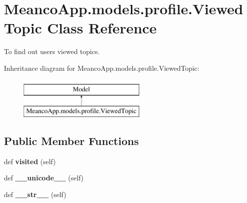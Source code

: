 \hypertarget{class_meanco_app_1_1models_1_1profile_1_1_viewed_topic}{}\section{Meanco\+App.\+models.\+profile.\+Viewed\+Topic Class Reference}
\label{class_meanco_app_1_1models_1_1profile_1_1_viewed_topic}


To find out users viewed topics.  


Inheritance diagram for Meanco\+App.\+models.\+profile.\+Viewed\+Topic\+:\begin{figure}[H]
\begin{center}
\leavevmode
\includegraphics[height=2.000000cm]{class_meanco_app_1_1models_1_1profile_1_1_viewed_topic}
\end{center}
\end{figure}
\subsection*{Public Member Functions}
\begin{DoxyCompactItemize}
\item 
\hypertarget{class_meanco_app_1_1models_1_1profile_1_1_viewed_topic_a1aa94a5df0d638d8eb022a9fc34f1b35}{}\label{class_meanco_app_1_1models_1_1profile_1_1_viewed_topic_a1aa94a5df0d638d8eb022a9fc34f1b35} 
def {\bfseries visited} (self)
\item 
\hypertarget{class_meanco_app_1_1models_1_1profile_1_1_viewed_topic_aca1ec9ee6f8a7a88520bc010da45a795}{}\label{class_meanco_app_1_1models_1_1profile_1_1_viewed_topic_aca1ec9ee6f8a7a88520bc010da45a795} 
def {\bfseries \+\_\+\+\_\+unicode\+\_\+\+\_\+} (self)
\item 
\hypertarget{class_meanco_app_1_1models_1_1profile_1_1_viewed_topic_a7ad8f79225209867391be09ef9ab2311}{}\label{class_meanco_app_1_1models_1_1profile_1_1_viewed_topic_a7ad8f79225209867391be09ef9ab2311} 
def {\bfseries \+\_\+\+\_\+str\+\_\+\+\_\+} (self)
\end{DoxyCompactItemize}
